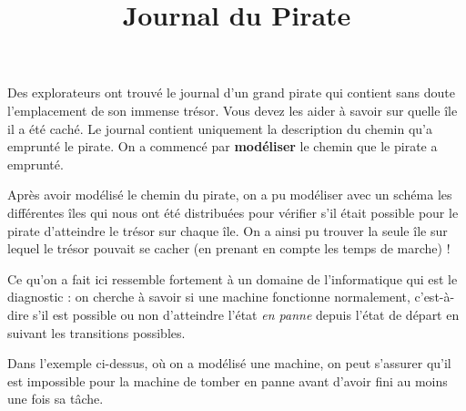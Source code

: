 \documentclass[12pt,a5paper]{article}
\date{\vspace{-12ex}}
\title{\vspace{-5ex}Journal du Pirate}
\begin{document}
\maketitle
\thispagestyle{fancy}
\justifying

Des explorateurs ont trouvé le journal d’un grand pirate qui contient sans doute l’emplacement de son immense trésor. Vous devez les aider à savoir sur quelle île il a été caché. Le journal contient uniquement la description du chemin qu’a emprunté le pirate.
On a commencé par \textbf{modéliser} le chemin que le pirate a emprunté.

{
\centering
\begin{figure}[h]
  \centering
{}
\end{figure}
}

Après avoir modélisé le chemin du pirate, on a pu modéliser avec un schéma les différentes îles qui nous ont été distribuées pour vérifier
s'il était possible pour le pirate d'atteindre le trésor sur chaque île.
On a ainsi pu trouver la seule île sur lequel le trésor pouvait se cacher (en prenant en compte les temps de marche) !

\vspace{3mm}

Ce qu'on a fait ici ressemble fortement à un domaine de l'informatique qui est le diagnostic : on cherche à savoir si une machine fonctionne
normalement, c'est-à-dire s'il est possible ou non d'atteindre l'état \textit{en panne} depuis l'état de départ en suivant les transitions
possibles.

\begin{center}
\end{center}

Dans l'exemple ci-dessus, où on a modélisé une machine, on peut s'assurer qu'il est impossible pour la machine de tomber en panne avant d'avoir
fini au moins une fois sa tâche.
\end{document}
